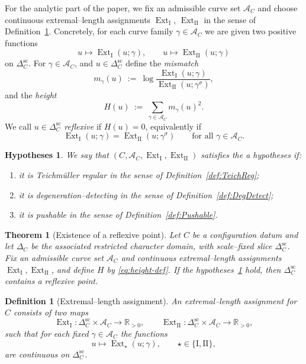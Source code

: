 \documentclass[10pt,a4paper]{amsart}
\newtheorem{definition}{Definition}
\newtheorem{Hypotheses}{Hypotheses}
\newtheorem{theorem}{Theorem}
\DeclareMathOperator{\Ext}{Ext}
\newcommand{\R}{\mathbb{R}}
\begin{document}
For the analytic part of the paper, we fix an admissible curve set $\mathcal A_C$ and choose
continuous extremal--length assignments $\Ext_{\mathrm{I}},\,\Ext_{\mathrm{II}}$ in the sense of
Definition~\ref{def:ExtAssign}.
Concretely, for each curve family $\gamma\in\mathcal A_C$ we are given two positive functions
\[
u\longmapsto \Ext_{\mathrm{I}}(u;\gamma),\qquad
u\longmapsto \Ext_{\mathrm{II}}(u;\gamma)
\]
on $\Delta_C^{\mathrm{sc}}$. For $\gamma\in\mathcal A_C$, and \(u\in\Delta_C^{\mathrm{sc}}\) define the \emph{mismatch}
\[
m_\gamma(u)\ :=\ \log\frac{\Ext_{\mathrm{I}}(u;\gamma)}{\Ext_{\mathrm{II}}(u;\gamma^\sigma)},
\]
and  the \emph{height}
\begin{equation}\label{eq:height-def}
H(u)\ :=\ \sum_{\gamma\in\mathcal A_C} m_\gamma(u)^2.
\end{equation}
We call $u\in\Delta_C^{\mathrm{sc}}$ \emph{reflexive} if $H(u)=0$, equivalently if
\[
\Ext_{\mathrm{I}}(u;\gamma)=\Ext_{\mathrm{II}}(u;\gamma^\sigma)\qquad\text{for all }\gamma\in\mathcal A_C.
\]
\begin{Hypotheses}\label{def:axioms}
We say that $(C,\mathcal A_C,\Ext_{\mathrm{I}},\Ext_{\mathrm{II}})$ satisfies the a hypotheses if:
\begin{enumerate}[label=\textup{(H\arabic*)}, leftmargin=2.8em]
\item it is Teichm\"uller regular in the sense of Definition~\ref{def:TeichReg};
\item it is degeneration--detecting in the sense of Definition~\ref{def:DegDetect};
\item it is pushable in the sense of Definition~\ref{def:Pushable}.
\end{enumerate}
\end{Hypotheses}

\begin{theorem}[Existence of a reflexive point]\label{thm:main}
Let $C$ be a configuration datum and let $\Delta_C$ be the associated restricted character domain, with scale--fixed slice
$\Delta_C^{\mathrm{sc}}$.
Fix an admissible curve set $\mathcal A_C$ and continuous extremal--length assignments $\Ext_{\mathrm{I}},\Ext_{\mathrm{II}}$,
and define $H$ by \eqref{eq:height-def}.
If the  hypotheses~\ref{def:axioms} hold, then $\Delta_C^{\mathrm{sc}}$ contains a reflexive point.
\end{theorem}

\begin{definition}[Extremal--length assignment]\label{def:ExtAssign}
An \emph{extremal--length assignment} for $C$ consists of two maps
\[
\Ext_{\mathrm{I}}:\Delta_C^{\mathrm{sc}}\times \mathcal A_C\longrightarrow \R_{>0},
\qquad
\Ext_{\mathrm{II}}:\Delta_C^{\mathrm{sc}}\times \mathcal A_C\longrightarrow \R_{>0},
\]
such that for each fixed $\gamma\in\mathcal A_C$ the functions
\[
u\longmapsto \Ext_{\star}(u;\gamma),\qquad \star\in\{\mathrm{I},\mathrm{II}\},
\]
are continuous on $\Delta_C^{\mathrm{sc}}$.
\end{definition}
\end{document}

